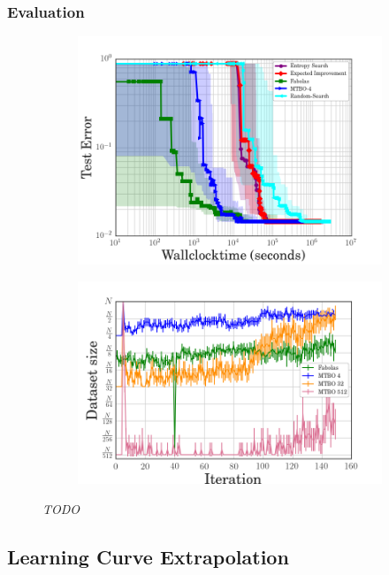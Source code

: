 \subsubsection{Evaluation}%
\label{sec:hyperparams:fabolas:eval}

\begin{figure}[h]
	\begin{subfigure}{0.5\textwidth}
		\centering
		\includegraphics[width=0.85\linewidth]{gfx/fabolas/time1.png}
	\end{subfigure}
	\begin{subfigure}{0.5\textwidth}
		\centering
		\includegraphics[width=0.95\linewidth]{gfx/fabolas/size.png}
	\end{subfigure}
	\caption{\textit{TODO}}\label{fig:fabolas}
\end{figure}

\subsection{Learning Curve Extrapolation}%
\label{sec:hyperparams:earlyterm}

